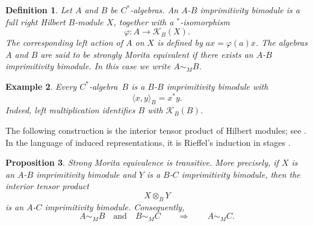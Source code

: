 \documentclass{book}
\newtheorem{definition}{Definition}[section]
\newtheorem{example}[definition]{Example}
\newtheorem{proposition}[definition]{Proposition}
\def\cstar{\(C^*\)-algebra}
\def\cstars{\(C^*\)-algebras}
\begin{document}
\begin{definition}
Let \(A\) and \(B\) be \cstars. An
\textnormal{\(A\)-\(B\) imprimitivity bimodule} is a full right
Hilbert \(B\)-module \(X\), together with a \(^*\)-isomorphism
\[
  \varphi:A\longrightarrow\mathcal K_B(X).
\]
The corresponding left action of \(A\) on \(X\) is defined by
\(ax=\varphi(a)x\).
The algebras \(A\) and \(B\) are said to be
\textnormal{strongly Morita equivalent} if there exists an
\(A\)-\(B\) imprimitivity bimodule. In this case we write
\(A\sim_M B\).
\end{definition}
\begin{example}
  Every \cstar\ \(B\) is a \(B\)-\(B\) imprimitivity bimodule with
  \[
    \langle x,y\rangle_B=x^*y.
  \]
  Indeed, left multiplication identifies \(B\) with \(\mathcal K_B(B)\).
\end{example}

The following construction is the interior tensor product of Hilbert modules;
see \cite[Section~13.5]{Blackadar1998}.  In the language of induced
representations, it is Rieffel's induction in stages
\cite[Theorem~5.9]{Rieffel1974}.

\begin{proposition}\label{prop:MoritaTransitivity}
  Strong Morita equivalence is transitive. More precisely, if \(X\) is an
  \(A\)-\(B\) imprimitivity bimodule and \(Y\) is a \(B\)-\(C\)
  imprimitivity bimodule, then the interior tensor product
  \[
    X\otimes_B Y
  \]
  is an \(A\)-\(C\) imprimitivity bimodule. Consequently,
  \[
    A\sim_M B\quad\text{and}\quad B\sim_M C
    \qquad\Longrightarrow\qquad
    A\sim_M C.
  \]
\end{proposition}
\end{document}
